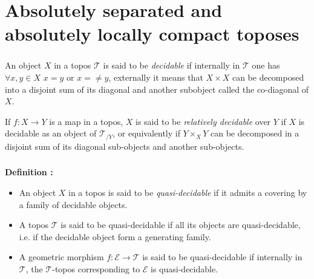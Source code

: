 \documentclass[a4paper]{article}
\newcommand{\Ecal}{\mathcal{E}}
\newcommand{\Tcal}{\mathcal{T}}
\newcommand{\block}[1]
{

\par \subsubsection{} #1

\bigskip}
\newcommand{\Def}[1]
	{
	
	\bigskip
	
	\textbf{Definition : }{\itshape #1}
	
	\bigskip
	
	}
\begin{document}
\section{Absolutely separated and absolutely locally compact toposes}
\label{Sec_topoProp}

\block{An object $X$ in a topos $\Tcal$ is said to be \emph{decidable} if internally in $\Tcal$ one has $\forall x,y \in X$ $x=y$ or $x=\neq y$, externally it means that $X \times X$ can be decomposed into a disjoint sum of its diagonal and another subobject called the co-diagonal of $X$.


If $f:X \rightarrow Y$ is a map in a topos, $X$ is said to be \emph{relatively decidable} over $Y$ if $X$ is decidable as an object of $\Tcal_{/Y}$, or equivalently if $Y \times_X Y$ can be decomposed in a disjoint sum of its diagonal sub-objects and another sub-objects.
}


\block{\Def{ \begin{itemize}

\item An object $X$ in a topos is said to be \emph{quasi-decidable} if it admits a covering by a family of decidable objects.

\item A topos $\Tcal$ is said to be quasi-decidable if all its objects are quasi-decidable, i.e. if the decidable object form a generating family.

\item A geometric morphism $f: \Ecal \rightarrow \Tcal$ is said to be quasi-decidable if internally in $\Tcal$, the $\Tcal$-topos corresponding to $\Ecal$ is quasi-decidable.

\end{itemize}
}
}
\end{document}
